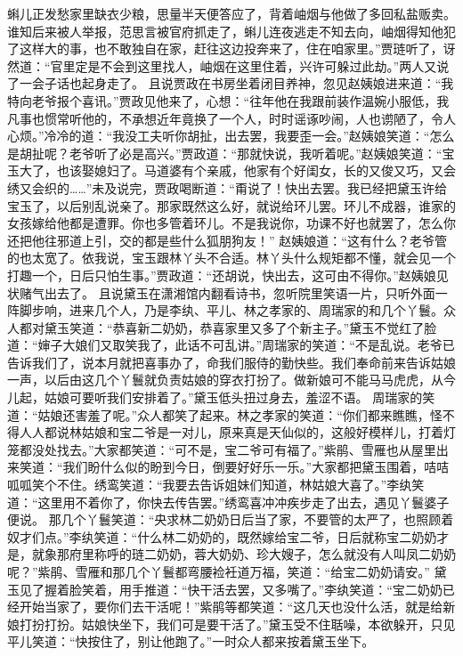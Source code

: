 \documentclass[12pt,oneside]{book}
\begin{document}
蝌儿正发愁家里缺衣少粮，思量半天便答应了，背着岫烟与他做了多回私盐贩卖。谁知后来被人举报，范思言被官府抓走了，蝌儿连夜逃走不知去向，岫烟得知他犯了这样大的事，也不敢独自在家，赶往这边投奔来了，住在咱家里。”贾琏听了，讶然道：“官里定是不会到这里找人，岫烟在这里住着，兴许可躲过此劫。”两人又说了一会子话也起身走了。
且说贾政在书房坐着闭目养神，忽见赵姨娘进来道：“我特向老爷报个喜讯。”贾政见他来了，心想：“往年他在我跟前装作温婉小服低，我凡事也惯常听他的，不承想近年竟换了一个人，时时谣诼吵闹，人也谫陋了，令人心烦。”冷冷的道：“我没工夫听你胡扯，出去罢，我要歪一会。”赵姨娘笑道：“怎么是胡扯呢？老爷听了必是高兴。”贾政道：“那就快说，我听着呢。”赵姨娘笑道：“宝玉大了，也该娶媳妇了。马道婆有个亲戚，他家有个好闺女，长的又俊又巧，又会绣又会织的……”未及说完，贾政喝断道：“甭说了！快出去罢。我已经把黛玉许给宝玉了，以后别乱说亲了。那家既然这么好，就说给环儿罢。环儿不成器，谁家的女孩嫁给他都是遭罪。你也多管着环儿。不是我说你，功课不好也就罢了，怎么你还把他往邪道上引，交的都是些什么狐朋狗友！”
赵姨娘道：“这有什么？老爷管的也太宽了。依我说，宝玉跟林丫头不合适。林丫头什么规矩都不懂，就会见一个打趣一个，日后只怕生事。”贾政道：“还胡说，快出去，这可由不得你。”赵姨娘见状赌气出去了。
且说黛玉在潇湘馆内翻看诗书，忽听院里笑语一片，只听外面一阵脚步响，进来几个人，乃是李纨、平儿、林之孝家的、周瑞家的和几个丫鬟。众人都对黛玉笑道：“恭喜新二奶奶，恭喜家里又多了个新主子。”黛玉不觉红了脸道：“婶子大娘们又取笑我了，此话不可乱讲。”周瑞家的笑道：“不是乱说。老爷已告诉我们了，说本月就把喜事办了，命我们服侍的勤快些。我们奉命前来告诉姑娘一声，以后由这几个丫鬟就负责姑娘的穿衣打扮了。做新娘可不能马马虎虎，从今儿起，姑娘可要听我们安排着了。”黛玉低头扭过身去，羞涩不语。
周瑞家的笑道：“姑娘还害羞了呢。”众人都笑了起来。林之孝家的笑道：“你们都来瞧瞧，怪不得人人都说林姑娘和宝二爷是一对儿，原来真是天仙似的，这般好模样儿，打着灯笼都没处找去。”大家都笑道：“可不是，宝二爷可有福了。”紫鹃、雪雁也从屋里出来笑道：“我们盼什么似的盼到今日，倒要好好乐一乐。”大家都把黛玉围着，咭咭呱呱笑个不住。绣鸾笑道：“我要去告诉姐妹们知道，林姑娘大喜了。”李纨笑道：“这里用不着你了，你快去传告罢。”绣鸾喜冲冲疾步走了出去，遇见丫鬟婆子便说。
那几个丫鬟笑道：“央求林二奶奶日后当了家，不要管的太严了，也照顾着奴才们点。”李纨笑道：“什么林二奶奶的，既然嫁给宝二爷，日后就称宝二奶奶才是，就象那府里称呼的琏二奶奶，蓉大奶奶、珍大嫂子，怎么就没有人叫凤二奶奶呢？”紫鹃、雪雁和那几个丫鬟都弯腰裣衽道万福，笑道：“给宝二奶奶请安。”
黛玉见了握着脸笑着，用手推道：“快干活去罢，又多嘴了。”李纨笑道：“宝二奶奶已经开始当家了，要你们去干活呢！”紫鹃等都笑道：“这几天也没什么活，就是给新娘打扮打扮。姑娘快坐下，我们可是要干活了。”黛玉受不住聒噪，本欲躲开，只见平儿笑道：“快按住了，别让他跑了。”一时众人都来按着黛玉坐下。
\end{document}
